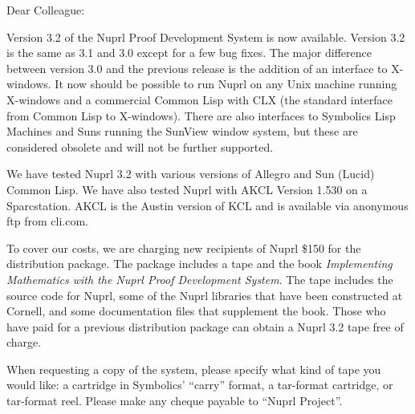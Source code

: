 
\oddsidemargin 0in
\evensidemargin 0in
\textwidth 6.5in
 \topmargin 0in
 \headheight 0in
 \footheight 0in
 \headsep 0in
 \textheight 9in

\signature{Elizabeth Maxwell}

\address{\hspace{0in}}

\date{}

\raggedright

\pagestyle{empty}



\begin{letter}{\hspace{0in}}

\opening
{Dear Colleague:
}



Version 3.2 of the Nuprl Proof Development System is now available.
Version 3.2 is the same as 3.1 and 3.0 except for a few bug fixes.
The major difference between version 3.0 and the previous release is
the addition of an interface to X-windows.  It now should be possible
to run Nuprl on any Unix machine running X-windows and a commercial
Common Lisp with CLX (the standard interface from Common Lisp to
X-windows).  There are also interfaces to Symbolics Lisp Machines and
Suns running the SunView window system, but these are considered
obsolete and will not be further supported.

We have tested Nuprl 3.2 with various versions of Allegro and Sun
(Lucid) Common Lisp.  We have also tested Nuprl with AKCL Version
1.530 on a Sparcstation.  AKCL is the Austin version of KCL and is
available via anonymous ftp from cli.com.

To cover our costs, we are charging new recipients of Nuprl \$150 for
the distribution package.  The package includes a tape and the book
{\em Implementing Mathematics with the Nuprl Proof Development
System}.  The tape includes the source code for Nuprl, some of the
Nuprl libraries that have been constructed at Cornell, and some
documentation files that supplement the book.  Those who have paid for
a previous distribution package can obtain a Nuprl 3.2 tape free of
charge.

When requesting a copy of the system, please specify what kind of tape
you would like: a cartridge in Symbolics' ``carry'' format, a tar-format
cartridge, or tar-format reel.  Please make any cheque payable to ``Nuprl
Project''.


\end{letter}
